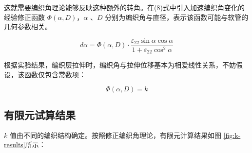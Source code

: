 \begin{figure}[!htp]
{	\label{fig:k-2}
}
	\hspace{0.5cm}
\end{figure}



这就需要编织角理论能够反映这种额外的转角。在(8)式中引入加速编织角变化的经验修正函数 $ \Phi \left( {\alpha ,D} \right) $，$ \alpha  $ 、$ D $ 分别为编织角与直径，表示该函数可能与软管的几何参数相关。
	  
	  

\begin{equation}
d\alpha  = \Phi \left( {\alpha ,D} \right) \cdot \frac{{{\varepsilon _{22}}\sin \alpha \cos \alpha }}{{1 + {\varepsilon _{22}}{{\cos }^2}\alpha }}
\end{equation}


根据实验结果，编织层拉伸时，编织角与拉伸位移基本为相爱线性关系，不妨假设，该函数仅包含常数项：


\begin{equation}
\Phi \left( {\alpha , D} \right) = k
\end{equation}


\subsection{有限元试算结果}

$ k $ 值由不同的编织结构确定。按照修正编织角理论，有限元计算结果如图 \ref{fig:k-results}所示： 

